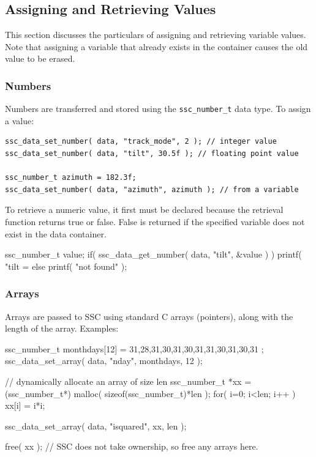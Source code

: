 \documentclass{scrartcl} %
\newcommand{\+}{\discretionary{\mbox{\scriptsize$\hookleftarrow$}}{}{}}
\begin{document}
\subsection{Assigning and Retrieving Values}

This section discusses the particulars of assigning and retrieving variable values.  Note that assigning a variable that already exists in the container causes the old value to be erased.

\subsubsection{Numbers}

Numbers are transferred and stored using the \texttt{ssc\_number\_t} data type.  To assign a value:

\begin{verbatim}
ssc_data_set_number( data, "track_mode", 2 ); // integer value
ssc_data_set_number( data, "tilt", 30.5f ); // floating point value

ssc_number_t azimuth = 182.3f;
ssc_data_set_number( data, "azimuth", azimuth ); // from a variable
\end{verbatim}

To retrieve a numeric value, it first must be declared because the retrieval function returns true or false.  False is returned if the specified variable does not exist in the data container.

\begin{verbatimtab}[4]
ssc_number_t value;
if( ssc_data_get_number( data, "tilt", &value ) )
	printf( "tilt = %
else
	printf( "not found\n" );
\end{verbatimtab}

\subsubsection{Arrays}

Arrays are passed to SSC using standard C arrays (pointers), along with the length of the array. Examples:

\begin{verbatimtab}
ssc_number_t monthdays[12] = { 31,28,31,30,31,30,31,31,30,31,30,31 };
ssc_data_set_array( data, "nday", monthdays, 12 );

// dynamically allocate an array of size len
ssc_number_t *xx = (ssc_number_t*) malloc( sizeof(ssc_number_t)*len );
for( i=0; i<len; i++ ) xx[i] = i*i;

ssc_data_set_array( data, "isquared", xx, len );

free( xx ); // SSC does not take ownership, so free any arrays here.
\end{verbatimtab}
\end{document}
